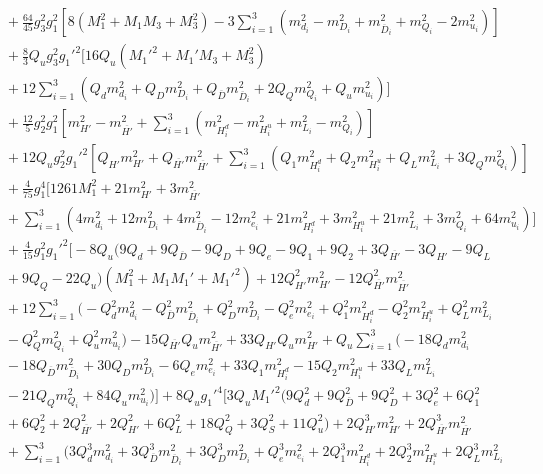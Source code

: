 \documentclass[preprint,amsmath,amssymb,aps,superscriptaddress,prd,showpacs,floatfix,nofootinbib]{revtex4-1}
\begin{document}
\begin{subequations}
\begin{align}
&{}+\frac{64}{45}g_3^2g_1^2\left [ 8\left (M_1^2+M_1M_3+M_3^2\right )-3\sum_{i=1}^3\left ( m_{d_i}^2-m_{D_i}^2+m_{\overline{D}_i}^2+m_{Q_i}^2-2m_{u_i}^2\right )\right ]\nonumber\\
&{}+\frac{8}{3}Q_ug_3^2g_1'^2\bigg [ 16Q_u\left (M_1'^2+M_1'M_3+M_3^2\right )\nonumber\\
&{}+12\sum_{i=1}^3\left ( Q_dm_{d_i}^2+Q_Dm_{D_i}^2+Q_{\overline{D}}m_{\overline{D}_i}^2+2Q_Qm_{Q_i}^2+Q_um_{u_i}^2\right )\bigg ]\nonumber\\
&{}+\frac{12}{5}g_2^2g_1^2\left [ m_{H'}^2-m_{\overline{H'}}^2+\sum_{i=1}^3\left ( m_{H_i^d}^2-m_{H_i^u}^2+m_{L_i}^2-m_{Q_i}^2\right )\right ]\nonumber\\
&{}+12Q_ug_2^2g_1'^2\left [ Q_{H'}m_{H'}^2+Q_{\overline{H'}}m_{\overline{H'}}^2+\sum_{i=1}^3\left ( Q_1m_{H_i^d}^2+Q_2m_{H_i^u}^2+Q_Lm_{L_i}^2+3Q_Qm_{Q_i}^2\right )\right ]\nonumber\\
&{}+\frac{4}{75}g_1^4\bigg [ 1261M_1^2+21m_{H'}^2+3m_{\overline{H'}}^2\nonumber\\
&{}+\sum_{i=1}^3\left ( 4m_{d_i}^2+12m_{D_i}^2+4m_{\overline{D}_i}^2-12m_{e_i}^2+21m_{H_i^d}^2+3m_{H_i^u}^2+21m_{L_i}^2+3m_{Q_i}^2+64m_{u_i}^2\right )\bigg ]\nonumber\\
&{}+\frac{4}{15}g_1^2g_1'^2\bigg [ -8Q_u\big ( 9Q_d+9Q_{\overline{D}}-9Q_D+9Q_e-9Q_1+9Q_2+3Q_{\overline{H'}}-3Q_{H'}-9Q_L\nonumber\\
&{}+9Q_Q-22Q_u\big )\left ( M_1^2+M_1M_1'+M_1'^2 \right )+12Q_{H'}^2m_{H'}^2-12Q_{\overline{H'}}^2m_{\overline{H'}}^2\nonumber\\
&{}+12\sum_{i=1}^3\big ( -Q_d^2m_{d_i}^2-Q_{\overline{D}}^2m_{\overline{D}_i}^2+Q_D^2m_{D_i}^2-Q_e^2m_{e_i}^2+Q_1^2m_{H_i^d}^2-Q_2^2m_{H_i^u}^2+Q_L^2m_{L_i}^2\nonumber\\
&{}-Q_Q^2m_{Q_i}^2+Q_u^2m_{u_i}^2\big )-15Q_{\overline{H'}}Q_um_{\overline{H'}}^2+33Q_{H'}Q_um_{H'}^2+Q_u\sum_{i=1}^3\big ( -18Q_dm_{d_i}^2\nonumber\\
&{}-18Q_{\overline{D}}m_{\overline{D}_i}^2+30Q_Dm_{D_i}^2-6Q_em_{e_i}^2+33Q_1m_{H_i^d}^2-15Q_2m_{H_i^u}^2+33Q_Lm_{L_i}^2\nonumber\\
&{}-21Q_Qm_{Q_i}^2+84Q_um_{u_i}^2\big )\bigg ]+8Q_ug_1'^4\bigg [ 3Q_uM_1'^2\big ( 9Q_d^2+9Q_{\overline{D}}^2+9Q_D^2+3Q_e^2+6Q_1^2\nonumber\\
&{}+6Q_2^2+2Q_{\overline{H'}}^2+2Q_{H'}^2+6Q_L^2+18Q_Q^2+3Q_S^2+11Q_u^2 \big )+2Q_{H'}^3m_{H'}^2+2Q_{\overline{H'}}^3m_{\overline{H'}}^2\nonumber\\
&{}+\sum_{i=1}^3\big ( 3Q_d^3m_{d_i}^2+3Q_{\overline{D}}^3m_{\overline{D}_i}^2+3Q_D^3m_{D_i}^2+Q_e^3m_{e_i}^2+2Q_1^3m_{H_i^d}^2+2Q_2^3m_{H_i^u}^2+2Q_L^3m_{L_i}^2\nonumber\\

\end{align}
\end{subequations}
\end{document}
